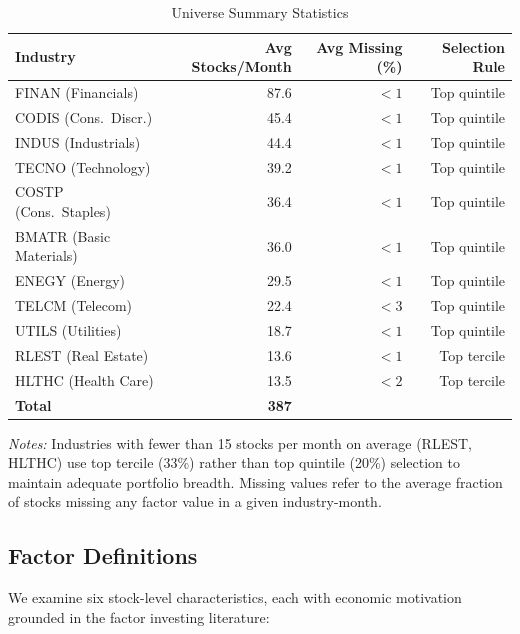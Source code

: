 \documentclass[12pt,a4paper]{article}
\begin{document}
\begin{table}[H]
\centering
\caption{Universe Summary Statistics}
\label{tab:universe}
\small
\begin{tabular}{lrrr}
\toprule
\textbf{Industry} & \textbf{Avg Stocks/Month} & \textbf{Avg Missing (\%)} & \textbf{Selection Rule} \\
\midrule
FINAN (Financials)       & 87.6 & $<1$ & Top quintile \\
CODIS (Cons.\ Discr.)   & 45.4 & $<1$ & Top quintile \\
INDUS (Industrials)      & 44.4 & $<1$ & Top quintile \\
TECNO (Technology)       & 39.2 & $<1$ & Top quintile \\
COSTP (Cons.\ Staples)  & 36.4 & $<1$ & Top quintile \\
BMATR (Basic Materials)  & 36.0 & $<1$ & Top quintile \\
ENEGY (Energy)           & 29.5 & $<1$ & Top quintile \\
TELCM (Telecom)          & 22.4 & $<3$ & Top quintile \\
UTILS (Utilities)        & 18.7 & $<1$ & Top quintile \\
RLEST (Real Estate)      & 13.6 & $<1$ & Top tercile \\
HLTHC (Health Care)      & 13.5 & $<2$ & Top tercile \\
\midrule
\textbf{Total}           & \textbf{387} & & \\
\bottomrule
\end{tabular}
\begin{minipage}{\textwidth}
\vspace{0.3em}
\footnotesize
\textit{Notes:} Industries with fewer than 15 stocks per month on average (RLEST, HLTHC) use top tercile (33\%) rather than top quintile (20\%) selection to maintain adequate portfolio breadth. Missing values refer to the average fraction of stocks missing any factor value in a given industry-month.
\end{minipage}
\end{table}

\subsection{Factor Definitions}

We examine six stock-level characteristics, each with economic motivation grounded in the factor investing literature:
\end{document}
